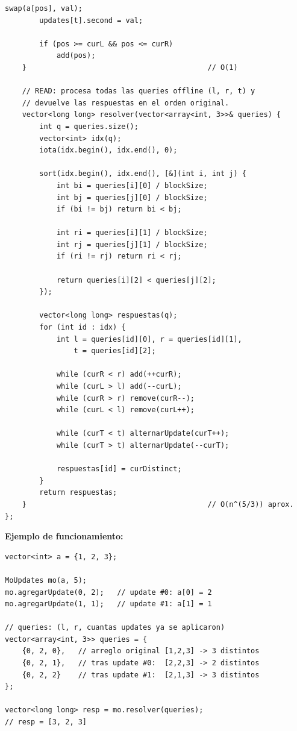 \documentclass[10pt,a4paper,twocolumn]{article}
\begin{document}
\begin{lstlisting}[style=cpp]
        swap(a[pos], val);
        updates[t].second = val;

        if (pos >= curL && pos <= curR)
            add(pos);
    }                                          // O(1)

    // READ: procesa todas las queries offline (l, r, t) y
    // devuelve las respuestas en el orden original.
    vector<long long> resolver(vector<array<int, 3>>& queries) {
        int q = queries.size();
        vector<int> idx(q);
        iota(idx.begin(), idx.end(), 0);

        sort(idx.begin(), idx.end(), [&](int i, int j) {
            int bi = queries[i][0] / blockSize;
            int bj = queries[j][0] / blockSize;
            if (bi != bj) return bi < bj;

            int ri = queries[i][1] / blockSize;
            int rj = queries[j][1] / blockSize;
            if (ri != rj) return ri < rj;

            return queries[i][2] < queries[j][2];
        });

        vector<long long> respuestas(q);
        for (int id : idx) {
            int l = queries[id][0], r = queries[id][1],
                t = queries[id][2];

            while (curR < r) add(++curR);
            while (curL > l) add(--curL);
            while (curR > r) remove(curR--);
            while (curL < l) remove(curL++);

            while (curT < t) alternarUpdate(curT++);
            while (curT > t) alternarUpdate(--curT);

            respuestas[id] = curDistinct;
        }
        return respuestas;
    }                                          // O(n^(5/3)) aprox.
};
\end{lstlisting}

\textbf{Ejemplo de funcionamiento:}

\begin{lstlisting}[style=cpp]
vector<int> a = {1, 2, 3};

MoUpdates mo(a, 5);
mo.agregarUpdate(0, 2);   // update #0: a[0] = 2
mo.agregarUpdate(1, 1);   // update #1: a[1] = 1

// queries: (l, r, cuantas updates ya se aplicaron)
vector<array<int, 3>> queries = {
    {0, 2, 0},   // arreglo original [1,2,3] -> 3 distintos
    {0, 2, 1},   // tras update #0:  [2,2,3] -> 2 distintos
    {0, 2, 2}    // tras update #1:  [2,1,3] -> 3 distintos
};

vector<long long> resp = mo.resolver(queries);
// resp = [3, 2, 3]
\end{lstlisting}
\end{document}
